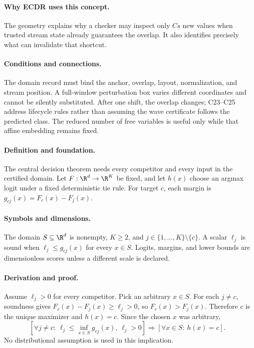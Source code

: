 \paragraph{Why ECDR uses this concept.}
The geometry explains why a checker may inspect only $Cs$ new values when trusted stream state already guarantees the overlap. It also identifies precisely what can invalidate that shortcut.
\paragraph{Conditions and connections.}
The domain record must bind the anchor, overlap, layout, normalization, and stream position. A full-window perturbation box varies different coordinates and cannot be silently substituted. After one shift, the overlap changes; C23--C25 address lifecycle rules rather than assuming the wave certificate follows the predicted class. The reduced number of free variables is useful only while that affine embedding remains fixed.

\paragraph{Definition and foundation.}
The central decision theorem needs every competitor and every input in the certified domain. Let $F:\R^d\to\R^K$ be fixed, and let $h(x)$ choose an argmax logit under a fixed deterministic tie rule. For target $c$, each margin is $g_{cj}(x)=F_c(x)-F_j(x)$.
\paragraph{Symbols and dimensions.}
The domain $S\subseteq\R^d$ is nonempty, $K\ge2$, and $j\in\{1,\ldots,K\}\setminus\{c\}$. A scalar $\ell_j$ is sound when $\ell_j\le g_{cj}(x)$ for every $x\in S$. Logits, margins, and lower bounds are dimensionless scores unless a different scale is declared.
\paragraph{Derivation and proof.}
Assume $\ell_j>0$ for every competitor. Pick an arbitrary $x\in S$. For each $j\ne c$, soundness gives $F_c(x)-F_j(x)\ge\ell_j>0$, so $F_c(x)>F_j(x)$. Therefore $c$ is the unique maximizer and $h(x)=c$. Since the chosen $x$ was arbitrary,
\[
 \left[\forall j\ne c:\ \ell_j\le\inf_{x\in S}g_{cj}(x),\ \ell_j>0\right]
 \Longrightarrow\left[\forall x\in S:\ h(x)=c\right].
\]
No distributional assumption is used in this implication.

